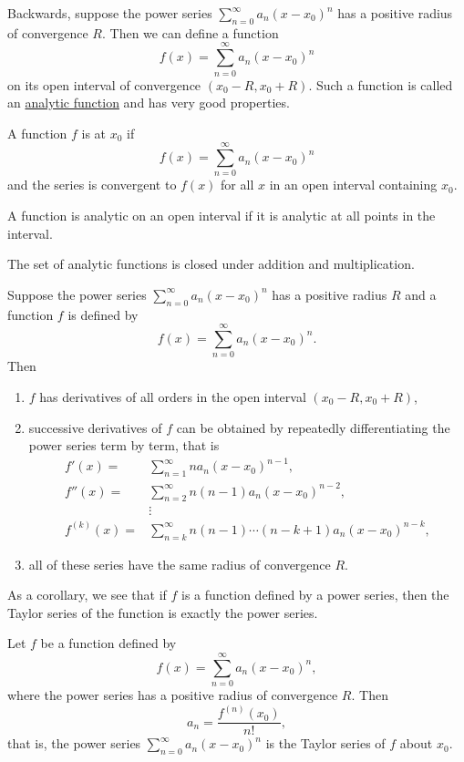 Backwards, suppose the power series $\sum\limits_{n=0}^\infty a_n(x-x_0)^n$ has a positive radius of convergence $R$. Then we can define a function
\[f(x)=\sum_{n=0}^\infty a_n(x-x_0)^n\]
on its open interval of convergence $(x_0-R, x_0+R)$. Such a function is called an \href{https://en.wikipedia.org/wiki/Analytic_function}{analytic function} and has very good properties.

\begin{definition}
  A function $f$ is  at $x_0$ if 
  \[f(x)=\sum\limits_{n=0}^{\infty }a_n\left(x-x_0\right)^{n}\] 
  and the series is convergent to $f(x)$ for all $x$ in an open interval containing $x_0$.
  
  A function is analytic on an open interval if it is analytic at all points in the interval.
\end{definition}

The set of analytic functions is closed under addition and multiplication.

\begin{theorem}
Suppose the power series $\sum_{n=0}^\infty a_n(x-x_0)^n$ has a positive radius $R$ and a function $f$ is defined by
\[f(x)=\sum_{n=0}^\infty a_n(x-x_0)^n.\]
Then 
\begin{enumerate}
  \item 
  $f$ has derivatives of all orders in the open interval $(x_0-R, x_0+R)$,
\item successive derivatives of $f$ can be obtained by repeatedly differentiating the power series term by term, that is
\[
  \begin{aligned} 
    f'(x)=&{\sum_{n=1}^\infty na_n(x-x_0)^{n-1}},\\
    f''(x)=&{\sum_{n=2}^\infty n(n-1)a_n(x-x_0)^{n-2}},\\ 
    &\vdots\\
    f^{(k)}(x)=&{\sum_{n=k}^\infty n(n-1)\cdots(n-k+1)a_n(x-x_0)^{n-k}},
  \end{aligned}
\]
\item all of these series have the same radius of convergence $R$.
\end{enumerate}
\end{theorem}

As a corollary, we see that if $f$ is a function defined by a power series, then the Taylor series of the function is exactly the power series.

\begin{corollary}
  Let $f$ be a function defined by
\[f(x)=\sum_{n=0}^\infty a_n(x-x_0)^n,\]
where the power series has a positive radius of convergence $R$. 
Then
\[a_n=\frac{f^{(n)}(x_0)}{n!},\]
that is, the power series $\sum_{n=0}^\infty a_n(x-x_0)^n$ is the Taylor series of $f$ about $x_0$.
\end{corollary}

